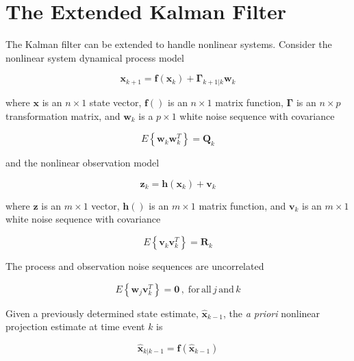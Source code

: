 \section{The Extended Kalman Filter}
\label{The Extended Kalman Filter}

The Kalman filter can be extended to handle nonlinear systems. Consider the nonlinear system dynamical process model

\begin{equation*}
    \mathbf{x}_{k+1} = \mathbf{f} \left( \mathbf{x}_k \right) + \mathbf{\Gamma}_{k+1|k} \mathbf{w}_k
\end{equation*}

where $\mathbf{x}$ is an $n \times 1$ state vector, $\mathbf{f}()$ is an $n \times 1$
matrix function, $\mathbf{\Gamma}$ is an $n \times p$ transformation matrix, and $\mathbf{w}_k$
is a $p \times 1$ white noise sequence with covariance

\begin{equation*}
    E \left\{ \mathbf{w}_k \mathbf{w}_k^T \right\} = \mathbf{Q}_k
\end{equation*}

and the nonlinear observation model

\begin{equation*}
    \mathbf{z}_k = \mathbf{h} \left( \mathbf{x}_k \right) + \mathbf{v}_k
\end{equation*}

where $\mathbf{z}$ is an $m \times 1$ vector, $\mathbf{h}()$ is an $m \times 1$ matrix
function, and $\mathbf{v}_k$ is an $m \times 1$ white noise sequence with covariance

\begin{equation*}
    E \left\{ \mathbf{v}_k \mathbf{v}_k^T \right\} = \mathbf{R}_k
\end{equation*}

The process and observation noise sequences are uncorrelated

\begin{equation*}
    E \left\{ \mathbf{w}_j \mathbf{v}_k^T \right\} = \mathbf{0} \, , \phantom{.} \mathrm{for} \, \mathrm{all} \, j \, \mathrm{and} \, k
\end{equation*}

Given a previously determined state estimate, $\hat{\mathbf{x}}_{k-1}$, the \textit{a priori}
nonlinear projection estimate at time event $k$ is

\begin{equation*}
    \hat{\mathbf{x}}_{k|k-1} = \mathbf{f} \left( \hat{\mathbf{x}}_{k-1} \right)
\end{equation*}

